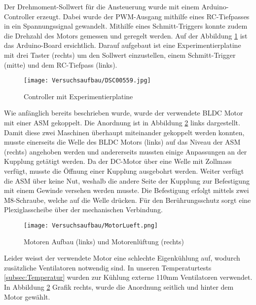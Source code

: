 Der Drehmoment-Sollwert für die Ansteuerung wurde mit einem Arduino-Controller erzeugt. Dabei wurde der PWM-Ausgang mithilfe eines RC-Tiefpasses in ein Spannungssignal gewandelt. Mithilfe eines Schmitt-Triggers konnte zudem die Drehzahl des Motors gemessen und geregelt werden. Auf der Abbildung \ref{fig:Mikrocontroller} ist das Arduino-Board ersichtlich. Darauf aufgebaut ist eine Experimentierplatine mit drei Taster (rechts) um den Sollwert einzustellen, einem Schmitt-Trigger (mitte) und dem RC-Tiefpass (links).

\begin{figure}[H]
	\begin{center}
		\texttt{[image: Versuchsaufbau/DSC00559.jpg]}
		\caption[Controller]{Controller mit Experimentierplatine}
		\label{fig:Mikrocontroller}
	\end{center}
\end{figure}

Wie anfänglich bereits beschrieben wurde, wurde der verwendete BLDC Motor mit einer ASM gekoppelt. Die Anordnung ist in Abbildung \ref{fig:MotorenLueftung} links dargestellt. Damit diese zwei Maschinen überhaupt miteinander gekoppelt werden konnten, musste einerseits die Welle des BLDC Motors (links) auf das Niveau der ASM (rechts) angehoben werden und andererseits mussten einige Anpassungen an der Kupplung getätigt werden. Da der DC-Motor über eine Welle mit Zollmass verfügt, musste die Öffnung einer Kupplung ausgebohrt werden. Weiter verfügt die ASM über keine Nut, weshalb die andere Seite der Kupplung zur Befestigung mit einem Gewinde versehen werden musste. Die Befestigung erfolgt mittels zwei M8-Schraube, welche auf die Welle drücken. Für den Berührungsschutz sorgt eine Plexiglasscheibe über der mechanischen Verbindung.


\begin{figure}[H]
	\begin{center}
		\texttt{[image: Versuchsaufbau/MotorLueft.png]}
		\caption[Motoren Aufbau und Motorenlüftung]{Motoren Aufbau (links) und Motorenlüftung (rechts)}
		\label{fig:MotorenLueftung}
	\end{center}
\end{figure}

Leider weisst der verwendete Motor eine schlechte Eigenkühlung auf, wodurch zusätzliche Ventilatoren notwendig sind. In unseren Temperaturtests \ref{subsec:Temperatur} wurden zur Kühlung externe 110mm Ventilatoren verwendet. In Abbildung \ref{fig:MotorenLueftung} Grafik rechts, wurde die Anordnung seitlich und hinter dem Motor gewählt.


